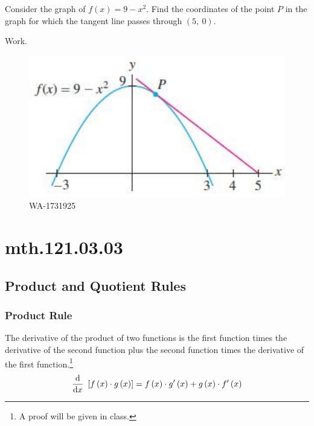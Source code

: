 \documentclass[12pt,addpoints, answers, fleqn]{exam}
\begin{document}
\begin{teacher}
\begin{questions}
Consider the graph of $f\left(x\right) = 9 - x^2$. Find the coordinates of the point $P$ in the graph for which the tangent line passes through $\left(5, \ 0 \right)$.
\begin{solution}
Work.
\end{solution}
\begin{figure}[htbp] %
   \centering
   \includegraphics[width=5in]{./graphics/1731925.pdf} 
   \caption{WA-1731925}
   \label{fig:1731925}
\end{figure}

\end{questions}
\end{teacher}


\vfill
\pagebreak


\section{mth.121.03.03}
\subsection{Product and Quotient Rules}
\subsubsection{Product Rule}
The derivative of the product of two functions is the first function times the derivative of the second function plus the second function times the derivative of the first function.\footnote{A proof will be given in class.}
\[
\frac{{\rm{d}}}{{\rm{d}}x} \ \left[ f\left( x \right) \cdot g\left( x \right) \right]  = f\left( x \right) \cdot g'\left( x \right) + g\left( x \right) \cdot f'\left( x \right)
\]
\end{document}
